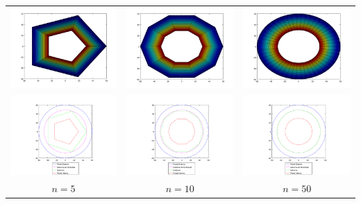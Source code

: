           {\centering \begin{tabular}{ccc}
            \includegraphics[width=4.5cm]{graficos/exp4/const/exp4-const-ang-5.png} &
            \includegraphics[width=4.5cm]{graficos/exp4/const/exp4-const-ang-10.png} &
            \includegraphics[width=4.5cm]{graficos/exp4/const/exp4-const-ang-50.png} \\
            \includegraphics[width=5cm]{graficos/exp4/const/exp4-const-ang-5-iso.png} &
            \includegraphics[width=5cm]{graficos/exp4/const/exp4-const-ang-10-iso.png} &
            \includegraphics[width=5cm]{graficos/exp4/const/exp4-const-ang-50-iso.png} \\
            {\small $n = 5$} &
            {\small $n = 10$} &
            {\small $n = 50$} \\
          \end{tabular}}

